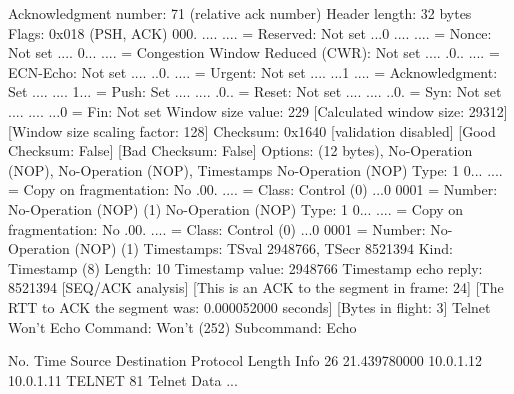     Acknowledgment number: 71    (relative ack number)
    Header length: 32 bytes
    Flags: 0x018 (PSH, ACK)
        000. .... .... = Reserved: Not set
        ...0 .... .... = Nonce: Not set
        .... 0... .... = Congestion Window Reduced (CWR): Not set
        .... .0.. .... = ECN-Echo: Not set
        .... ..0. .... = Urgent: Not set
        .... ...1 .... = Acknowledgment: Set
        .... .... 1... = Push: Set
        .... .... .0.. = Reset: Not set
        .... .... ..0. = Syn: Not set
        .... .... ...0 = Fin: Not set
    Window size value: 229
    [Calculated window size: 29312]
    [Window size scaling factor: 128]
    Checksum: 0x1640 [validation disabled]
        [Good Checksum: False]
        [Bad Checksum: False]
    Options: (12 bytes), No-Operation (NOP), No-Operation (NOP), Timestamps
        No-Operation (NOP)
            Type: 1
                0... .... = Copy on fragmentation: No
                .00. .... = Class: Control (0)
                ...0 0001 = Number: No-Operation (NOP) (1)
        No-Operation (NOP)
            Type: 1
                0... .... = Copy on fragmentation: No
                .00. .... = Class: Control (0)
                ...0 0001 = Number: No-Operation (NOP) (1)
        Timestamps: TSval 2948766, TSecr 8521394
            Kind: Timestamp (8)
            Length: 10
            Timestamp value: 2948766
            Timestamp echo reply: 8521394
    [SEQ/ACK analysis]
        [This is an ACK to the segment in frame: 24]
        [The RTT to ACK the segment was: 0.000052000 seconds]
        [Bytes in flight: 3]
Telnet
    Won't Echo
        Command: Won't (252)
        Subcommand: Echo

No.     Time           Source                Destination           Protocol Length Info
     26 21.439780000   10.0.1.12             10.0.1.11             TELNET   81     Telnet Data ...

